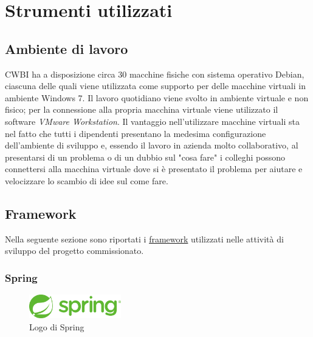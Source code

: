 \chapter{Strumenti utilizzati}
\label{cap:strumenti-utilizzati}


\setlength{\parskip}{3ex}

\section{Ambiente di lavoro}
CWBI ha a disposizione circa 30 macchine fisiche con sistema operativo Debian, ciascuna delle quali viene utilizzata come supporto per delle macchine virtuali in ambiente Windows 7. Il lavoro quotidiano viene svolto in ambiente virtuale e non fisico; per la connessione alla propria macchina virtuale viene utilizzato il software \textit{VMware Workstation}. Il vantaggio nell'utilizzare macchine virtuali sta nel fatto che tutti i dipendenti presentano la medesima configurazione dell'ambiente di sviluppo e, essendo il lavoro in azienda molto collaborativo, al presentarsi di un problema o di un dubbio sul "cosa fare" i colleghi possono connettersi alla macchina virtuale dove si è presentato il problema per aiutare e velocizzare lo scambio di idee sul come fare.

\pagebreak

\section{Framework}
Nella seguente sezione sono riportati i {\hyperref[sec:framework-definition]{framework}}\glsfirstoccur \; utilizzati nelle attività di sviluppo del progetto commissionato. 

\subsection{Spring}

\begin{figure}[!h]
	\centering
	\includegraphics[width=4cm]{../images/Spring-logo.png}
	\caption{Logo di Spring}
\end{figure}

